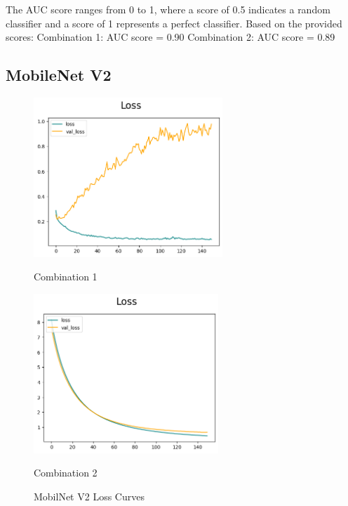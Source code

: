 The AUC score ranges from 0 to 1, where a score of 0.5 indicates a random classifier and a score of 1 represents a perfect classifier. Based on the provided scores: \newline
Combination 1: AUC score = 0.90 \newline
Combination 2: AUC score = 0.89 \newline

\subsection{MobileNet V2}

\begin{figure}[H]
    \centering
    \begin{minipage}[b]{0.49\textwidth}
        \centering
        \includegraphics[width=\textwidth, height=6cm]{Figures/unbalanced_data/without bn/mn2/loss.png}
        \captionsetup{labelformat=empty}
        \caption{Combination 1}
        \label{fig:u_wo_r_l}
    \end{minipage}
    \hfill
    \begin{minipage}[b]{0.49\textwidth}
        \centering
        \includegraphics[width=\textwidth, height=6cm]{Figures/unbalanced_data/with bn/mn2/loss.png}
        \captionsetup{labelformat=empty}
        \caption{Combination 2}
        \label{fig:u_w_r_l}
    \end{minipage}
    \captionsetup{labelformat=default}
    \caption{MobilNet V2 Loss Curves}
\end{figure}


